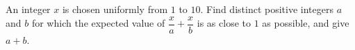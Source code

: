 An integer $x$ is chosen uniformly from $1$ to $10$. Find distinct positive integers $a$ and $b$ for which the expected value of $\dfrac xa+\dfrac xb$ is as close to $1$ as possible, and give $a+b$.
